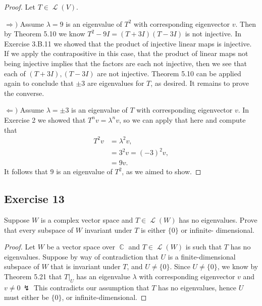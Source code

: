 \documentclass[letterpaper, 12pt]{amsart}
\DeclareMathOperator{\C}{\mathbb{C}}				%
\DeclareMathOperator{\Ell}{\mathscr{L}}				%
\theoremstyle{definition}  							%
\newcommand{\Ra}{\Rightarrow}                   %
\newcommand{\La}{\Leftarrow}                    %
\begin{document}
		\begin{proof}
		Let $T \in \Ell(V)$.

		$\Ra)$ Assume $\lambda = 9$ is an eigenvalue of $T^2$ with corresponding eigenvector $v$.
		Then by Theorem 5.10 we know $T^2-9I = (T+3I)(T-3I)$ is not injective.
		In Exercise 3.B.11 we showed that the product of injective linear maps is injective.
		If we apply the contrapositive in this case, that the product of linear maps not being injective implies that the factors are each not injective, then we see that each of $(T+3I),(T-3I)$ are not injective.
		Theorem 5.10 can be applied again to conclude that $\pm3$ are eigenvalues for $T$, as desired.
		It remains to prove the converse.

		$\La)$ Assume $\lambda = \pm3$ is an eigenvalue of $T$ with corresponding eigenvector $v$.
		In Exercise 2 we showed that $T^nv = \lambda^nv$, so we can apply that here and compute that 
			\begin{align*}
				T^{2}v &= \lambda^2v, \\
				&= 3^2v = (-3)^2v, \\
				&= 9v.
			\end{align*}
		It follows that $9$ is an eigenvalue of $T^2$, as we aimed to show.
		\end{proof}

		\subsection*{Exercise 13}
		Suppose $W$ is a complex vector space and $T \in \Ell(W)$ has no eigenvalues. 
		Prove that every subspace of $W$ invariant under $T$ is either $\{ 0 \}$ or infinite- dimensional.

		\begin{proof}
		Let $W$ be a vector space over $\C$ and $T \in \Ell(W)$ is such that $T$ has no eigenvalues.
		Suppose by way of contradiction that $U$ is a finite-dimensional subspace of $W$ that is invariant under $T$, and $U \neq \{0\}$.
		Since $U \neq \{0\}$, we know by Theorem 5.21 that $T|_{U}$ has an eigenvalue $\lambda$ with corresponding eigenvector $v$ and $v \neq 0 \, \lightning$
		This contradicts our assumption that $T$ has no eigenvalues, hence $U$ must either be $\{ 0 \}$, or infinite-dimensional.
		\end{proof}
\end{document}
